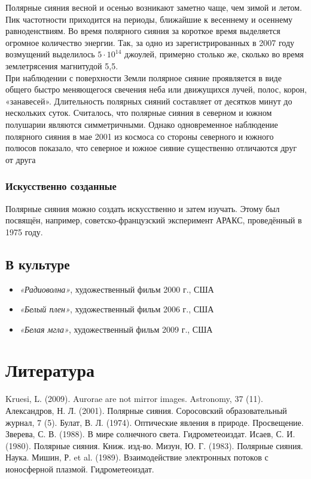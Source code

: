\documentclass[a4paper,14pt]{article}
\begin{document}
\indent Полярные сияния весной и осенью возникают заметно чаще, чем зимой и летом. Пик частотности приходится на периоды, ближайшие к 
весеннему и осеннему равноденствиям. Во время полярного сияния за короткое время выделяется огромное количество энергии. Так, за одно из 
зарегистрированных в 2007 году возмущений выделилось $5\cdot10^{14}$ джоулей, примерно столько же, сколько во время землетрясения
 магнитудой 5,5. \\
\indent При наблюдении с поверхности Земли полярное сияние проявляется в виде общего быстро меняющегося свечения неба или движущихся лучей,
полос, корон, «занавесей». Длительность полярных сияний составляет от десятков минут до нескольких суток. Считалось, что полярные
сияния в северном и южном полушарии являются симметричными. Однако одновременное наблюдение полярного сияния в мае 2001 из космоса
со стороны северного и южного полюсов показало, что северное и южное сияние существенно отличаются друг от друга

\subsubsection{Искусственно созданные}
Полярные сияния можно создать искусственно и затем изучать. Этому был посвящён, например, советско-французский эксперимент АРАКС,
проведённый в 1975 году.

\subsection{В культуре}
\begin{itemize}
 \item[\textcolor{blue}{\textbullet}]{\textit{«Радиоволна»}, художественный фильм 2000 г., США}
 \item[\textcolor{blue}{\textbullet}]{\textit{«Белый плен»}, художественный фильм 2006 г., США}
 \item[\textcolor{blue}{\textbullet}]{\textit{«Белая мгла»}, художественный фильм 2009 г., США}
\end{itemize}

\section{Литература}
Kruesi, L. (2009). Aurorae are not mirror images. Astronomy, 37 (11).
Александров, Н. Л. (2001). Полярные сияния. Соросовский образовательный журнал, 7 (5).
Булат, В. Л. (1974). Оптические явления в природе. Просвещение.
Зверева, С. В. (1988). В мире солнечного света. Гидрометеоиздат.
Исаев, С. И. (1980). Полярные сияния. Книж. изд-во.
Мизун, Ю. Г. (1983). Полярные сияния. Наука.
Мишин, Р. et al. (1989). Взаимодействие электронных потоков с ионосферной плазмой. Гидрометеоиздат.
\end{document}
